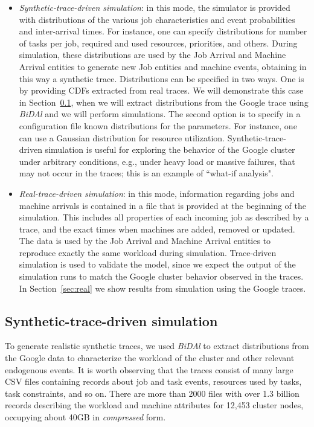 \documentclass{article}
\begin{document}
\begin{itemize}
\item \emph{Synthetic-trace-driven simulation}: in this mode, the simulator is provided with distributions of the various job characteristics and event probabilities and inter-arrival times. For instance, one can specify distributions for number of tasks per job, required and used resources, priorities, and others. During simulation, these distributions are used by the Job Arrival and Machine Arrival entities to generate new Job entities and machine events, obtaining in this way a synthetic trace. Distributions can be specified in two ways. One is by providing CDFs extracted from real traces. We will demonstrate this case in Section~\ref{sec:synth}, when we will extract distributions from the Google trace using \emph{BiDAl} and we will perform simulations. The second option is to specify in a configuration file known distributions for the parameters. For instance, one can use a Gaussian distribution for resource utilization. Synthetic-trace-driven simulation is useful for exploring the behavior of the Google cluster under arbitrary conditions, e.g., under heavy load or massive failures, that may not occur in the traces; this is an example of ``what-if analysis".

\item \emph{Real-trace-driven simulation}: in this mode, information regarding jobs and machine arrivals is contained in a file that is provided at the beginning of the simulation. This includes all properties of each incoming job as described by a trace, and the exact times when machines are added, removed or updated. The data is used by the Job Arrival and Machine Arrival entities to reproduce exactly the same workload during simulation. Trace-driven simulation is used to validate the model, since we expect the output of the simulation runs to match the Google cluster behavior observed in the traces. In Section~\ref{sec:real} we show results from simulation using the Google traces. 
\end{itemize}


\subsection{Synthetic-trace-driven simulation}
\label{sec:synth}

To generate realistic synthetic traces, we used \emph{BiDAl} to extract distributions from the Google data to characterize the workload of the cluster and other relevant endogenous events. It is worth observing that the traces consist of many large CSV files containing records about job and task events, resources used by tasks, task constraints, and so on. There are more than 2000 files with over 1.3 billion records describing the workload and machine attributes for 12,453 cluster nodes, occupying about 40GB in \emph{compressed} form.
\end{document}
